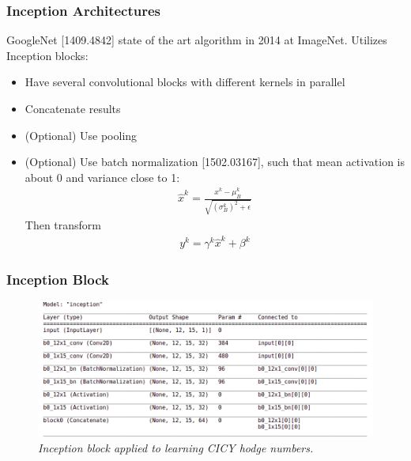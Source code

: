 \documentclass{beamer}
\begin{document}
\begin{frame}
\frametitle{Inception Architectures}
GoogleNet {\color{blue}[1409.4842]} state of the art algorithm in 2014 at ImageNet. Utilizes Inception blocks:
\begin{itemize}
	\item Have several convolutional blocks with different kernels in parallel 	\item Concatenate results
	\pause 
	\item (Optional) Use pooling
	\item (Optional) Use batch normalization {\color{blue} [1502.03167]}, such that mean activation is about 0 and variance close to 1:
	\begin{align}
		\hat{x}^k = \frac{x^k - \mu^k_B}{\sqrt{(\sigma^k_B)^2 + \epsilon}}
	\end{align}
	Then transform
	\begin{align}
		y^k = \gamma^k\hat{x}^k + \beta^k
	\end{align}
\end{itemize}
\end{frame}

\begin{frame}
\frametitle{Inception Block}
\begin{figure}
	\centering
	\includegraphics[scale=0.28]{inception_block.png}
	\caption{\it Inception block applied to learning CICY hodge numbers.}
\end{figure}
\end{frame}
\end{document}
